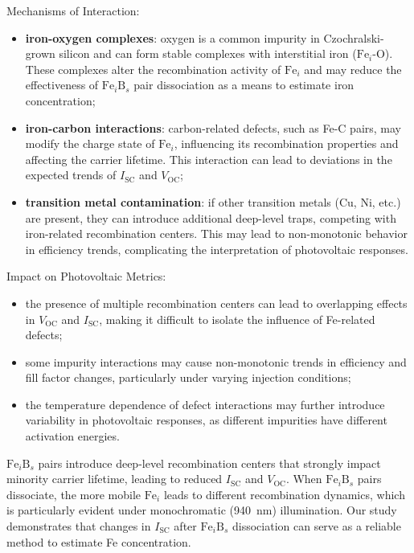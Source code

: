 \documentclass[a4paper,fleqn]{cas-sc}
\begin{document}
Mechanisms of Interaction:
\begin{itemize}
    \item \textbf{iron-oxygen complexes}: oxygen is a common impurity in Czochralski-grown silicon and can form stable complexes with interstitial iron ($\mathrm{Fe}_i$-O). These complexes alter the recombination activity of $\mathrm{Fe}_i$ and may reduce the effectiveness of $\mathrm{Fe}_i\mathrm{B}_s$ pair dissociation as a means to estimate iron concentration;
    \item \textbf{iron-carbon interactions}: carbon-related defects, such as Fe-C pairs, may modify the charge state of $\mathrm{Fe}_i$, influencing its recombination properties and affecting the carrier lifetime. This interaction can lead to deviations in the expected trends of $I_\mathrm{SC}$ and $V_\mathrm{OC}$;
    \item \textbf{transition metal contamination}: if other transition metals (Cu, Ni, etc.) are present, they can introduce additional deep-level traps, competing with iron-related recombination centers. This may lead to non-monotonic behavior in efficiency trends, complicating the interpretation of photovoltaic responses.
\end{itemize}


Impact on Photovoltaic Metrics:
\begin{itemize}
    \item the presence of multiple recombination centers can lead to overlapping effects in $V_\mathrm{OC}$ and $I_\mathrm{SC}$, making it difficult to isolate the influence of Fe-related defects;
    \item some impurity interactions may cause non-monotonic trends in efficiency and fill factor changes, particularly under varying injection conditions;
    \item the temperature dependence of defect interactions may further introduce variability in photovoltaic responses, as different impurities have different activation energies.
\end{itemize}


$\mathrm{Fe}_i\mathrm{B}_s$ pairs introduce deep-level recombination centers that strongly impact minority carrier lifetime, leading to reduced $I_\mathrm{SC}$ and $V_\mathrm{OC}$. When $\mathrm{Fe}_i\mathrm{B}_s$ pairs dissociate, the more mobile $\mathrm{Fe}_i$ leads to different recombination dynamics, which is particularly evident under monochromatic (940~nm) illumination. Our study demonstrates that changes in $I_\mathrm{SC}$ after $\mathrm{Fe}_i\mathrm{B}_s$ dissociation can serve as a reliable method to estimate Fe concentration.
\end{document}
